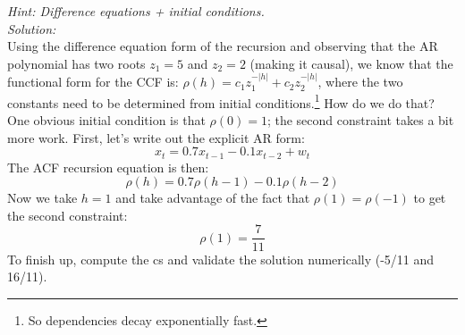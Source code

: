 \documentclass[12pt]{article}
\begin{document}
\emph{Hint: Difference equations + initial conditions.}\\
\noindent \emph{Solution:}\\
Using the difference equation form of the recursion and observing that the AR polynomial has two roots $z_1=5$ and $z_2 = 2$ (making it causal), we know that the functional form for the CCF is: $\rho(h) = c_1 z_1^{-|h|} + c_2 z_2^{-|h|}$, where the two constants need to be determined from initial conditions.\footnote{So dependencies decay exponentially fast.} How do we do that? One obvious initial condition is that $\rho(0) = 1$; the second constraint takes a bit more work. First, let's write out the explicit AR form:
$$ x_t = 0.7 x_{t-1} -0.1 x_{t-2} + w_t$$
The ACF recursion equation is then:
$$ \rho(h) = 0.7 \rho(h-1) -0.1 \rho(h-2)$$
Now we take $h =1$ and take advantage of the fact that $\rho(1) =\rho(-1)$ to get the second constraint:
$$ \rho(1) = \frac{7}{11}$$
To finish up, compute the cs and validate the solution numerically (-5/11 and 16/11).
\end{document}
